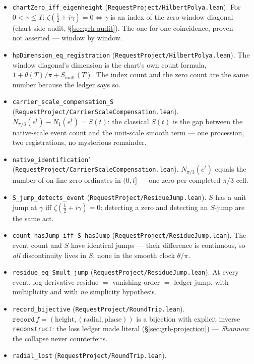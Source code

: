 \documentclass[11pt]{article}
\theoremstyle{definition}
\begin{document}
\begin{itemize}
\item \texttt{chartZero\_iff\_eigenheight}
(\texttt{RequestProject/HilbertPolya.lean}). For \(0<\gamma\le T\):
\(\zeta(\tfrac12+i\gamma)=0\iff\gamma\) is an index of the zero-window
diagonal (chart-side audit, \S\ref{sec:grh-audit}). The one-for-one
coincidence, proven --- not asserted --- window by window.
\item \texttt{hpDimension\_eq\_registration}
(\texttt{RequestProject/HilbertPolya.lean}). The window diagonal's dimension
is the chart's own count formula, \(1+\theta(T)/\pi+S_{\mathrm{mult}}(T)\).
The index count and the zero count are the same number because the ledger
says so.
\item \texttt{carrier\_scale\_compensation\_S}
(\texttt{RequestProject/CarrierScaleCompensation.lean}).
\(N_{\pi/3}(e^{t})-N_{1}(e^{t})=S(t)\): the classical \(S(t)\) is the gap
between the native-scale event count and the unit-scale smooth term --- one
procession, two registrations, no mysterious remainder.
\item \texttt{native\_identification$'$}
(\texttt{RequestProject/CarrierScaleCompensation.lean}).
\(N_{\pi/3}(e^{t})\) equals the number of on-line zero ordinates in
\((0,t]\) --- one zero per completed \(\pi/3\) cell.
\item \texttt{S\_jump\_detects\_event}
(\texttt{RequestProject/ResidueJump.lean}). \(S\) has a unit jump at
\(\gamma\) iff \(\zeta(\tfrac12+i\gamma)=0\): detecting a zero and detecting
an \(S\)-jump are the same act.
\item \texttt{count\_hasJump\_iff\_S\_hasJump}
(\texttt{RequestProject/ResidueJump.lean}). The event count and \(S\) have
identical jumps --- their difference is continuous, so \emph{all}
discontinuity lives in \(S\), none in the smooth clock \(\theta/\pi\).
\item \texttt{residue\_eq\_Smult\_jump}
(\texttt{RequestProject/ResidueJump.lean}). At every event,
log-derivative residue \(=\) vanishing order \(=\) ledger jump, with
multiplicity and with \emph{no} simplicity hypothesis.
\item \texttt{record\_bijective} (\texttt{RequestProject/RoundTrip.lean}).
\(\texttt{record}\,f=(\text{height},(\text{radial},\text{phase}))\) is a
bijection with explicit inverse \texttt{reconstruct}: the loss ledger made
literal (\S\ref{sec:grh-projection}) --- \emph{Shannon}: the collapse never counterfeits.
\item \texttt{radial\_lost} (\texttt{RequestProject/RoundTrip.lean}).

\end{itemize}
\end{document}
